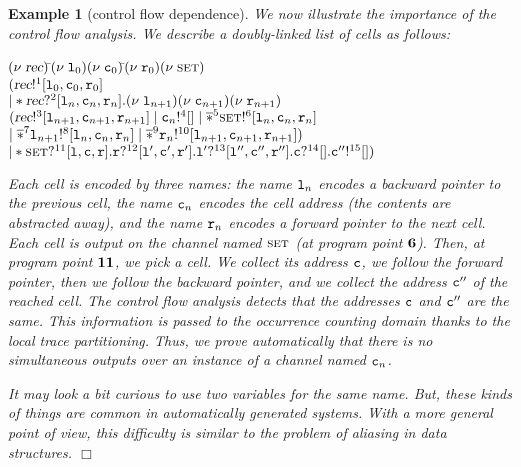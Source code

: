 \documentclass{article}
\newcommand{\boxexample}{$\Box$}
\newtheorem{example}[thm]{Example}
\newcommand{\concu}{|}
\newcommand{\nuu}{\nu\;}
\newcommand{\repli}{\ast}
\newcommand{\rec}{?}
\newcommand{\eme}{!}
\newcommand{\pp}[1]{$\bf{#1}$}
\newcommand{\pps}[1]{(at program point \pp{#1})}
\newcommand{\bang}[1]{\overline{\repli}^{#1}}
\newcommand{\internal}[1]{\textnormal{\texttt{#1}}}
\newcommand{\capability}[1]{\textsc{#1}}
\newcommand{\recur}[1]{{\textsl{#1}}}
\newcommand{\crec}{\recur{rec}}
\newcommand{\cfalaba}{1}
\newcommand{\cfalabc}{2}
\newcommand{\cfalabd}{3}
\newcommand{\cfalabe}{4}
\newcommand{\cfalabf}{5}
\newcommand{\cfalabg}{6}
\newcommand{\cfalabh}{7}
\newcommand{\cfalabi}{8}
\newcommand{\cfalabj}{9}
\newcommand{\cfalabk}{10}
\newcommand{\cfalabl}{11}
\newcommand{\cfalabm}{12}
\newcommand{\cfalabn}{13}
\newcommand{\cfalabo}{14}
\newcommand{\cfalabp}{15}
\newcommand{\llinkint}[1]{\internal{l}{#1}}
\newcommand{\rlinkint}[1]{\internal{r}{#1}}
\newcommand{\clinkint}[1]{\internal{c}{#1}}
\newcommand{\celllinkint}[1]{[\llinkint{#1},\clinkint{#1},\rlinkint{#1}]}
\newcommand{\llinkvar}[1]{\internal{l}{#1}}
\newcommand{\rlinkvar}[1]{\internal{r}{#1}}
\newcommand{\clinkvar}[1]{\internal{c}{#1}}
\newcommand{\cset}{\capability{set}}
\newcommand{\celllinkvar}[1]{[\llinkvar{#1},\clinkvar{#1},\rlinkvar{#1}]}
\begin{document}
\begin{example}[control flow dependence]
\label{cfahelp}
We now illustrate the importance of the control flow analysis.
We describe a doubly-linked list of cells as follows:

\begin{tabbing}
$(\nuu\crec)$\=$(\nuu\llinkint{_0})(\nuu\clinkint{_0})$\=$(\nuu\rlinkint{_0})(\nuu\cset)$\\
$(\crec\eme^{\cfalaba}\celllinkint{_0}$\\
$\concu
\repli\crec\rec^{\cfalabc}\celllinkvar{_n}.
    (\nuu\llinkint{_{n+1}})
    (\nuu\clinkint{_{n+1}})(\nuu\rlinkint{_{n+1}})$\\
\>$(\crec\eme^{\cfalabd}\celllinkint{_{n+1}}\;\concu\;\clinkvar{_n}\eme^{\cfalabe}[]\;\concu\; \bang{\cfalabf}\cset\eme^{\cfalabg}\celllinkvar{_n}$\\
\>$\concu\;\bang{\cfalabh}\llinkint{_{n+1}}\eme^{\cfalabi}\celllinkvar{_n}
       \;\concu\; \bang{\cfalabj}\rlinkvar{_n}\eme^{\cfalabk}\celllinkint{_{n+1}})$\\ 
$\concu\repli\cset\rec^{\cfalabl}\celllinkvar{}.\rlinkvar{}\rec^{\cfalabm}\celllinkvar{'}.\llinkvar{'}\rec^{\cfalabn}\celllinkvar{''}.\clinkvar{}\rec^{\cfalabo}[].\clinkvar{''}\eme^{\cfalabp}[])$
\end{tabbing}
Each cell is encoded by three names: the name $\llinkint{_n}$ encodes a backward pointer to the previous cell, the name $\clinkint{_n}$ encodes the cell address (the contents are abstracted away), and  the name $\rlinkint{_n}$ encodes a forward pointer to the next cell.
Each cell is output on the channel named $\cset$ \pps{\cfalabg}. 
Then, at program point ${\bf {\cfalabl}}$, we pick a cell.
We collect its address $\clinkvar{}$, we follow the forward pointer, 
then we follow the backward pointer, 
and we collect the address $\clinkvar{''}$ of the reached cell. 
The control flow analysis \cite{feret:sas2000} detects that the addresses
 $\clinkvar{}$ and $\clinkvar{''}$ are the same. This information is passed to the occurrence counting domain thanks to the local trace partitioning. Thus, we prove automatically that there is no simultaneous outputs over an instance of a channel named $\clinkint{_n}$.

It may look a bit curious to use two variables for the same name. 
But, these kinds of things are common in automatically generated systems. 
With a more general point of view, this difficulty is similar to the problem of aliasing in data structures. \boxexample
\end{example}
\end{document}
